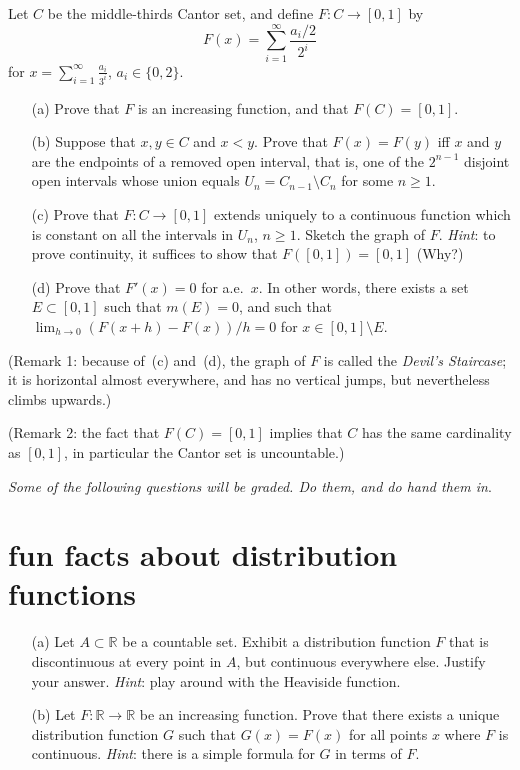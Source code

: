 \documentclass[lang=cn,11pt]{elegantbook}
\begin{document}
  Let $C$ be the middle-thirds Cantor set, and define $F\colon C\to [0,1]$ by
  \begin{equation}\label{eq:Cantorfunctiondefn}
    F(x)= \sum_{i=1}^\infty \frac{a_i/2}{2^i}
  \end{equation}
  for $x=\sum_{i=1}^\infty \frac{a_i}{3^i}$, $a_i\in \{0, 2\}$. 
  \begin{itemize}
  \item[(a)]
    Prove that $F$ is an increasing function, and that $F(C)=[0,1]$.
  \item[(b)]
    Suppose that $x,y\in C$ and $x<y$. Prove that $F(x)=F(y)$ iff $x$ and $y$ are the endpoints of a removed open interval, that is, one of the $2^{n-1}$ disjoint open intervals whose union equals $U_n=C_{n-1}\setminus C_n$ for some $n\ge1$.
  \item[(c)]
    Prove that $F\colon C\to[0,1]$ extends uniquely to a continuous function which is constant on all the intervals in $U_n$, $n\ge 1$. Sketch the graph of $F$.
    \textit{Hint}: to prove continuity, it suffices to show that $F([0,1])=[0,1]$ (Why?)
  \item[(d)]
    Prove that $F'(x)=0$ for a.e.\ $x$. In other words, there exists a set $E\subset[0,1]$ such that $m(E)=0$, and such that $\lim_{h\to 0}(F(x+h)-F(x))/h=0$ for $x\in[0,1]\setminus E$.
  \end{itemize}
  (Remark 1: because of~(c) and~(d), the graph of $F$ is called the \emph{Devil's Staircase}; it is horizontal almost everywhere, and has no vertical jumps, but nevertheless climbs upwards.)

  (Remark 2: the fact that $F(C)=[0,1]$ implies that $C$ has the same cardinality as $[0,1]$, in particular the Cantor set is uncountable.) 


\begin{center}
\textit{Some of the following questions will be graded. Do them, and do hand them in}.
\end{center}


\section{fun facts about distribution functions}
  \begin{itemize}
  \item[(a)]  Let $A\subset\mathbb{R}$ be a countable set. Exhibit a distribution function $F$ that is discontinuous at every point in $A$, but continuous everywhere else. Justify your answer. \textit{Hint}: play around with the Heaviside function.
  \item[(b)]Let $F\colon\mathbb{R}\to\mathbb{R}$ be an increasing function. Prove that there exists a unique distribution function $G$ such that $G(x)=F(x)$ for all points $x$ where $F$ is continuous.
    \textit{Hint}: there is a simple formula for $G$ in terms of $F$.
  \end{itemize}
\end{document}
